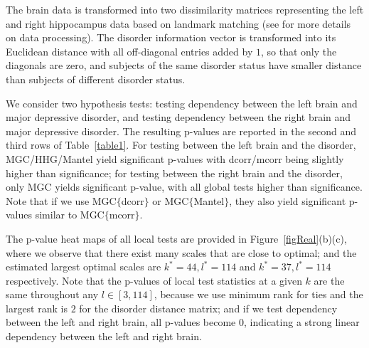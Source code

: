 \documentclass[11pt]{article}
\begin{document}
The brain data is transformed into two dissimilarity matrices representing the left and right hippocampus data based on landmark matching (see \cite{ParkEtAl2011} for more details on data processing). The disorder information vector is transformed into its Euclidean distance with all off-diagonal entries added by $1$, so that only the diagonals are zero, and subjects of the same disorder status have smaller distance than subjects of different disorder status. 

We consider two hypothesis tests: testing dependency between the left brain and major depressive disorder, and testing dependency between the right brain and major depressive disorder. The resulting p-values are reported in the second and third rows of Table~\ref{table1}. For testing between the left brain and the disorder, MGC/HHG/Mantel yield significant p-values with dcorr/mcorr being slightly higher than significance; for testing between the right brain and the disorder, only MGC yields significant p-value, with all global tests higher than significance. Note that if we use MGC$\{$dcorr$\}$ or MGC$\{$Mantel$\}$, they also yield significant p-values similar to MGC$\{$mcorr$\}$.

The p-value heat maps of all local tests are provided in Figure~\ref{figReal}(b)(c), where we observe that there exist many scales that are close to optimal; and the estimated largest optimal scales are $k^{*}=44,l^{*}=114$ and $k^{*}=37,l^{*}=114$ respectively. Note that the p-values of local test statistics at a given $k$ are the same throughout any $l \in [3,114]$, because we use minimum rank for ties and the largest rank is $2$ for the disorder distance matrix; and if we test dependency between the left and right brain, all p-values become $0$, indicating a strong linear dependency between the left and right brain.


\end{document}
